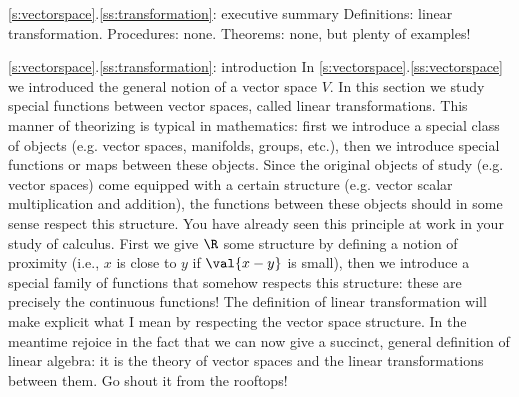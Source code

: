 \begin{frame}{\ref{s:vectorspace}.\ref{ss:transformation}: executive summary}
\alert{Definitions:} linear transformation.%
\bspace
\alert{Procedures:} none.
\bspace
\alert{Theorems:} none, but plenty of examples!
\end{frame}
\begin{frame}{\ref{s:vectorspace}.\ref{ss:transformation}: introduction}
In \ref{s:vectorspace}.\ref{ss:vectorspace} we introduced the general notion of a vector space $V$. In this section we study special functions between vector spaces, called \alert{linear transformations}. 
\bpause
This manner of theorizing is typical in mathematics: first we introduce a special class of objects (e.g. vector spaces, manifolds, groups, etc.), then we introduce special functions or maps between these objects. Since the original objects of study (e.g. vector spaces) come equipped with a certain structure (e.g. vector scalar multiplication and addition), the functions between these objects should in some sense \alert{respect} this structure. 
\bpause You have already seen this principle at work in your study of calculus. First we give $\R$ some structure by defining a notion of proximity (i.e., $x$ is close to $y$ if $\val{x-y}$ is small), then we introduce a special family of functions that somehow respects this structure: these are precisely the \alert{continuous} functions! 
\bpause
The definition of linear transformation will make explicit what I mean by respecting the vector space structure. 
\bpause
In the meantime rejoice in the fact that we can now give a succinct, general definition of linear algebra: it is the theory of vector spaces and the linear transformations between them. Go shout it from the rooftops!
\end{frame}
